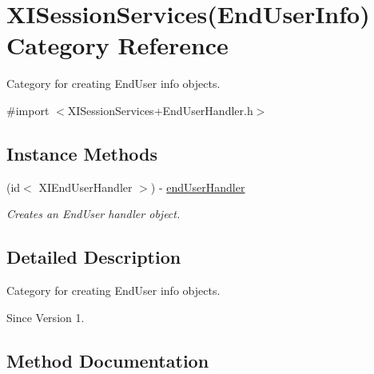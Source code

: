 \hypertarget{category_x_i_session_services_07_end_user_info_08}{}\section{X\+I\+Session\+Services(End\+User\+Info) Category Reference}
\label{category_x_i_session_services_07_end_user_info_08}


Category for creating End\+User info objects.  




{\ttfamily \#import $<$X\+I\+Session\+Services+\+End\+User\+Handler.\+h$>$}

\subsection*{Instance Methods}
\begin{DoxyCompactItemize}
\item 
(id$<$ X\+I\+End\+User\+Handler $>$) -\/ \hyperlink{category_x_i_session_services_07_end_user_info_08_a31ff82e0dfe6c8dd6b22ddb47348cdf8}{end\+User\+Handler}
\begin{DoxyCompactList}\small\item\em Creates an End\+User handler object. \end{DoxyCompactList}\end{DoxyCompactItemize}


\subsection{Detailed Description}
Category for creating End\+User info objects. 

\begin{DoxySince}{Since}
Version 1. 
\end{DoxySince}


\subsection{Method Documentation}
\hypertarget{category_x_i_session_services_07_end_user_info_08_a31ff82e0dfe6c8dd6b22ddb47348cdf8}{}\label{category_x_i_session_services_07_end_user_info_08_a31ff82e0dfe6c8dd6b22ddb47348cdf8} 
